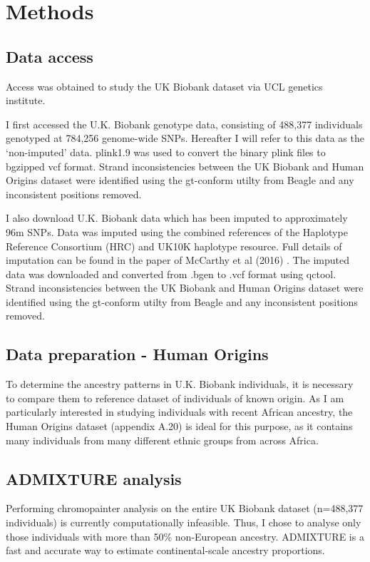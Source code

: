 \section{Methods}

\subsection{Data access}

Access was obtained to study the UK Biobank dataset via UCL genetics institute. 

I first accessed the U.K. Biobank genotype data, consisting of 488,377 individuals genotyped at 784,256 genome-wide SNPs. Hereafter I will refer to this data as the `non-imputed' data. plink1.9 \cite{purcell2007plink} was used to convert the binary plink files to bgzipped vcf format. Strand inconsistencies between the UK Biobank and Human Origins dataset were identified using the gt-conform utilty from Beagle and any inconsistent positions removed. 

I also download U.K. Biobank data which has been imputed to approximately 96m SNPs. Data was imputed using the combined references of the Haplotype Reference Consortium (HRC) and UK10K haplotype resource. Full details of imputation can be found in the paper of McCarthy et al (2016) \cite{mccarthy2016reference}. The imputed data was downloaded and converted from .bgen to .vcf format using qctool. Strand inconsistencies between the UK Biobank and Human Origins dataset were identified using the gt-conform utilty from Beagle and any inconsistent positions removed.

\subsection{Data preparation - Human Origins}

To determine the ancestry patterns in U.K. Biobank individuals, it is necessary to compare them to reference dataset of individuals of known origin. As I am particularly interested in studying individuals with recent African ancestry, the Human Origins dataset (appendix A.20) is ideal for this purpose, as it contains many individuals from many different ethnic groups from across Africa. 

\subsection{ADMIXTURE analysis}

Performing chromopainter analysis on the entire UK Biobank dataset (n=488,377 individuals) is currently computationally infeasible. Thus, I chose to analyse only those individuals with more than 50\% non-European ancestry. ADMIXTURE is a fast and accurate way to estimate continental-scale ancestry proportions.

